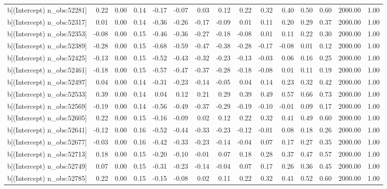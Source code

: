 \begin{table}[ht]
\begin{tabular}{rrrrrrrrrrrrrrr}
  b[(Intercept) n\_obs:52281] & 0.22 & 0.00 & 0.14 & -0.17 & -0.07 & 0.03 & 0.12 & 0.22 & 0.32 & 0.40 & 0.50 & 0.60 & 2000.00 & 1.00 \\ 
  b[(Intercept) n\_obs:52317] & 0.01 & 0.00 & 0.14 & -0.36 & -0.26 & -0.17 & -0.09 & 0.01 & 0.11 & 0.20 & 0.29 & 0.37 & 2000.00 & 1.00 \\ 
  b[(Intercept) n\_obs:52353] & -0.08 & 0.00 & 0.15 & -0.46 & -0.36 & -0.27 & -0.18 & -0.08 & 0.01 & 0.11 & 0.22 & 0.30 & 2000.00 & 1.00 \\ 
  b[(Intercept) n\_obs:52389] & -0.28 & 0.00 & 0.15 & -0.68 & -0.59 & -0.47 & -0.38 & -0.28 & -0.17 & -0.08 & 0.01 & 0.12 & 2000.00 & 1.00 \\ 
  b[(Intercept) n\_obs:52425] & -0.13 & 0.00 & 0.15 & -0.52 & -0.43 & -0.32 & -0.23 & -0.13 & -0.03 & 0.06 & 0.16 & 0.25 & 2000.00 & 1.00 \\ 
  b[(Intercept) n\_obs:52461] & -0.18 & 0.00 & 0.15 & -0.57 & -0.47 & -0.37 & -0.28 & -0.18 & -0.08 & 0.01 & 0.11 & 0.19 & 2000.00 & 1.00 \\ 
  b[(Intercept) n\_obs:52497] & 0.04 & 0.00 & 0.14 & -0.31 & -0.23 & -0.14 & -0.05 & 0.04 & 0.14 & 0.23 & 0.32 & 0.42 & 2000.00 & 1.00 \\ 
  b[(Intercept) n\_obs:52533] & 0.39 & 0.00 & 0.14 & 0.04 & 0.12 & 0.21 & 0.29 & 0.39 & 0.49 & 0.57 & 0.66 & 0.73 & 2000.00 & 1.00 \\ 
  b[(Intercept) n\_obs:52569] & -0.19 & 0.00 & 0.14 & -0.56 & -0.49 & -0.37 & -0.29 & -0.19 & -0.10 & -0.01 & 0.09 & 0.17 & 2000.00 & 1.00 \\ 
  b[(Intercept) n\_obs:52605] & 0.22 & 0.00 & 0.15 & -0.16 & -0.09 & 0.02 & 0.12 & 0.22 & 0.32 & 0.41 & 0.49 & 0.60 & 2000.00 & 1.00 \\ 
  b[(Intercept) n\_obs:52641] & -0.12 & 0.00 & 0.16 & -0.52 & -0.44 & -0.33 & -0.23 & -0.12 & -0.01 & 0.08 & 0.18 & 0.26 & 2000.00 & 1.00 \\ 
  b[(Intercept) n\_obs:52677] & -0.03 & 0.00 & 0.16 & -0.42 & -0.33 & -0.23 & -0.14 & -0.04 & 0.07 & 0.17 & 0.27 & 0.35 & 2000.00 & 1.00 \\ 
  b[(Intercept) n\_obs:52713] & 0.18 & 0.00 & 0.15 & -0.20 & -0.10 & -0.01 & 0.07 & 0.18 & 0.28 & 0.37 & 0.47 & 0.57 & 2000.00 & 1.00 \\ 
  b[(Intercept) n\_obs:52749] & 0.07 & 0.00 & 0.15 & -0.31 & -0.23 & -0.14 & -0.04 & 0.07 & 0.17 & 0.26 & 0.36 & 0.45 & 2000.00 & 1.00 \\ 
  b[(Intercept) n\_obs:52785] & 0.22 & 0.00 & 0.15 & -0.15 & -0.08 & 0.02 & 0.11 & 0.22 & 0.32 & 0.41 & 0.52 & 0.60 & 2000.00 & 1.00 \\ 

\end{tabular}
\end{table}
